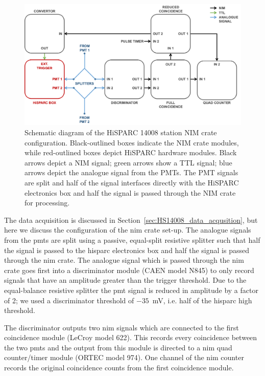 \begin{figure}[ht!]
	\centering
	\includegraphics[width=\columnwidth]{14008_nim_config.png}
	\caption{Schematic diagram of the HiSPARC 14008 station NIM crate configuration. Black-outlined boxes indicate the NIM crate modules, while red-outlined boxes depict HiSPARC hardware modules. Black arrows depict a NIM signal; green arrows show a TTL signal; blue arrows depict the analogue signal from the PMTs. The PMT signals are split and half of the signal interfaces directly with the HiSPARC electronics box and half the signal is passed through the NIM crate for processing.}
	\label{fig:14008_NIM}
\end{figure}

The data acquisition is discussed in Section~\ref{sec:HS14008_data_acqusition}, but here we discuss the configuration of the \gls{nim} crate set-up. The analogue signals from the \glspl{pmt} are split using a passive, equal-split resistive splitter such that half the signal is passed to the \gls{hisparc} electronics box and half the signal is passed through the \gls{nim} crate. The analogue signal which is passed through the \gls{nim} crate goes first into a discriminator module (CAEN model N845) to only record signals that have an amplitude greater than the trigger threshold. Due to the equal-balance resistive splitter the \gls{pmt} signal is reduced in amplitude by a factor of 2; we used a discriminator threshold of $-35$~mV, i.e. half of the \gls{hisparc} high threshold.

The discriminator outputs two \gls{nim} signals which are connected to the first coincidence module (LeCroy model 622). This records every coincidence between the two \glspl{pmt} and the output from this module is directed to a \gls{nim} quad counter/timer module (ORTEC model 974). One channel of the \gls{nim} counter records the original coincidence counts from the first coincidence module.

